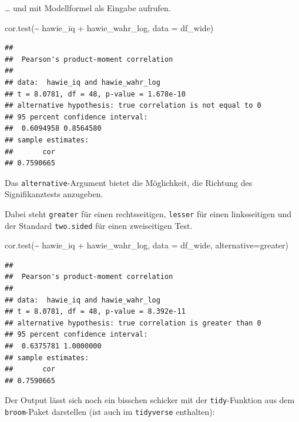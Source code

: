 \documentclass[
]{book}
\newenvironment{Shaded}{\begin{snugshade}}{\end{snugshade}}
\newcommand{\AttributeTok}[1]{\textcolor[rgb]{0.77,0.63,0.00}{#1}}
\newcommand{\FunctionTok}[1]{\textcolor[rgb]{0.00,0.00,0.00}{#1}}
\newcommand{\NormalTok}[1]{#1}
\newcommand{\SpecialCharTok}[1]{\textcolor[rgb]{0.00,0.00,0.00}{#1}}
\newcommand{\StringTok}[1]{\textcolor[rgb]{0.31,0.60,0.02}{#1}}
\begin{document}
\ldots{} und mit Modellformel als Eingabe aufrufen.

\begin{Shaded}
\begin{Highlighting}[]
\FunctionTok{cor.test}\NormalTok{(}\SpecialCharTok{\textasciitilde{}}\NormalTok{ hawie\_iq }\SpecialCharTok{+}\NormalTok{ hawie\_wahr\_log, }\AttributeTok{data =}\NormalTok{ df\_wide)}
\end{Highlighting}
\end{Shaded}

\begin{verbatim}
## 
##  Pearson's product-moment correlation
## 
## data:  hawie_iq and hawie_wahr_log
## t = 8.0781, df = 48, p-value = 1.678e-10
## alternative hypothesis: true correlation is not equal to 0
## 95 percent confidence interval:
##  0.6094958 0.8564580
## sample estimates:
##       cor 
## 0.7590665
\end{verbatim}

Das \texttt{alternative}-Argument bietet die Möglichkeit, die Richtung des Signifikanztests anzugeben.

Dabei steht \texttt{\textquotesingle{}greater\textquotesingle{}} für einen rechtsseitigen, \texttt{\textquotesingle{}lesser\textquotesingle{}} für einen linksseitigen und der Standard \texttt{\textquotesingle{}two.sided\textquotesingle{}} für einen zweiseitigen Test.

\begin{Shaded}
\begin{Highlighting}[]
\FunctionTok{cor.test}\NormalTok{(}\SpecialCharTok{\textasciitilde{}}\NormalTok{ hawie\_iq }\SpecialCharTok{+}\NormalTok{ hawie\_wahr\_log, }
         \AttributeTok{data =}\NormalTok{ df\_wide,}
         \AttributeTok{alternative=}\StringTok{\textquotesingle{}greater\textquotesingle{}}\NormalTok{) }
\end{Highlighting}
\end{Shaded}

\begin{verbatim}
## 
##  Pearson's product-moment correlation
## 
## data:  hawie_iq and hawie_wahr_log
## t = 8.0781, df = 48, p-value = 8.392e-11
## alternative hypothesis: true correlation is greater than 0
## 95 percent confidence interval:
##  0.6375781 1.0000000
## sample estimates:
##       cor 
## 0.7590665
\end{verbatim}

Der Output lässt sich noch ein bisschen schicker mit der \texttt{tidy}-Funktion aus dem \texttt{broom}-Paket darstellen (ist auch im \texttt{tidyverse} enthalten):
\end{document}
